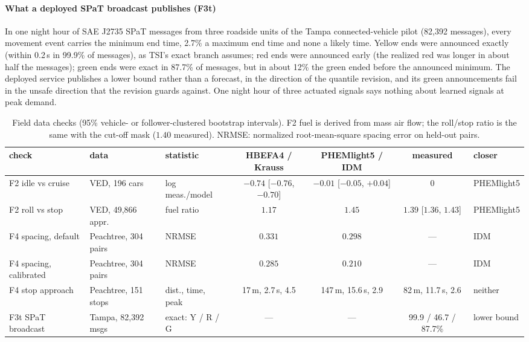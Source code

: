 \paragraph{What a deployed SPaT broadcast publishes (F3t)} In one night hour of SAE J2735 SPaT messages from three roadside units of the
Tampa connected-vehicle pilot \cite{tampaspat} (82,392 messages), every movement event carries the minimum end time, 2.7\% a maximum end
time and none a likely time. Yellow ends were announced exactly (within 0.2\,s in 99.9\% of messages), as TSI's exact branch assumes; red
ends were announced early (the realized red was longer in about half the messages); green ends were exact in 87.7\% of messages, but in
about 12\% the green ended before the announced minimum. The deployed service publishes a lower bound rather than a forecast, in the
direction of the quantile revision, and its green announcements fail in the unsafe direction that the revision guards against. One night
hour of three actuated signals says nothing about learned signals at peak demand.
\begin{table}[t]\centering\scriptsize\setlength{\tabcolsep}{3pt}
\caption{Field data checks (95\% vehicle- or follower-clustered bootstrap intervals). F2 fuel is derived from mass air flow; the roll/stop
ratio is the same with the cut-off mask ($1.40$ measured). NRMSE: normalized root-mean-square spacing error on held-out pairs.}\label{tab:field}
\begin{tabular}{@{}lllcccl@{}}\toprule
check & data & statistic & HBEFA4 / Krauss & PHEMlight5 / IDM & measured & closer\\\midrule
F2 idle vs cruise & VED, 196 cars & log meas./model & $-0.74$ [$-0.76$, $-0.70$] & $-0.01$ [$-0.05$, $+0.04$] & 0 & PHEMlight5\\
F2 roll vs stop & VED, 49,866 appr. & fuel ratio & $1.17$ & $1.45$ & $1.39$ [$1.36$, $1.43$] & PHEMlight5\\
F4 spacing, default & Peachtree, 304 pairs & NRMSE & $0.331$ & $0.298$ & --- & IDM\\
F4 spacing, calibrated & Peachtree, 304 pairs & NRMSE & $0.285$ & $0.210$ & --- & IDM\\
F4 stop approach & Peachtree, 151 stops & dist., time, peak & 17\,m, 2.7\,s, 4.5 & 147\,m, 15.6\,s, 2.9 & 82\,m, 11.7\,s, 2.6 & neither\\
F3t SPaT broadcast & Tampa, 82,392 msgs & exact: Y / R / G & --- & --- & 99.9 / 46.7 / 87.7\% & lower bound\\\bottomrule
\end{tabular}\end{table}


